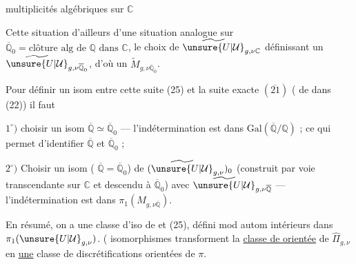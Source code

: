 multiplicités algébriques sur $\mathbb C$


Cette situation  d'ailleurs  d'une situation analogue sur $\overline{\mathbb Q}_0=\text{clôture alg de }\mathbb Q\text{ dans }\mathbb C$, le choix de $\widetilde{\unsure{U|\mathcal{U}}}_{g,\nu\mathbb C}$ définissant un $\widetilde{\unsure{U|\mathcal{U}}}_{g,\nu\overline{\mathbb Q}_0}$, d'où un $\widetilde{M}_{g,\nu\overline{\mathbb Q}_0}$.

Pour définir un isom entre cette suite (25) et la suite exacte $(\overline{21})$  ( de  dans (22)) il faut

$1^{\circ})$ choisir un isom $\overline{\mathbb Q}\simeq\overline{\mathbb Q}_0$ --- l'indétermination est dans $\mathrm{Gal}(\overline{\mathbb Q}/\mathbb Q)$ ; ce qui permet d'identifier $\overline{\mathbb Q}$ et $\overline{\mathbb Q}_0$ ;

$2^{\circ})$ Choisir un isom ( $\overline{\mathbb Q}=\overline{\mathbb Q}_0$) de $(\widetilde{\unsure{U|\mathcal{U}}}_{g,\nu})_0$ (construit par voie transcendante sur $\mathbb C$ et descendu à $\overline{\mathbb Q}_0$) avec $\widetilde{\unsure{U|\mathcal{U}}}_{g,\nu\overline{\mathbb Q}}$ --- l'indétermination est dans $\pi_1(M_{g,\nu\overline{\mathbb Q}})$.

En résumé, on a une classe d'iso de  et (25), défini mod autom  intérieurs dans  $\pi_1(\unsure{U|\mathcal{U}}_{g,\nu})$. ( isomorphismes  transforment la  \uline{classe de } \uline{orientée}  de $\widehat{\Pi}_{g,\nu}$ en   \uline{une} classe de discrétifications orientées de $\pi$.

